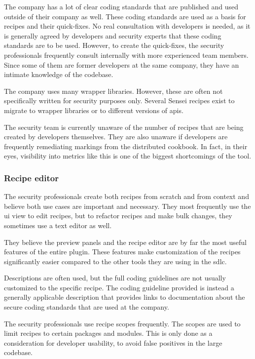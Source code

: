 The company has a lot of clear coding standards that are published and used outside of their company as well.
These coding standards are used as a basis for recipes and their quick-fixes.
No real consultation with developers is needed, as it is generally agreed by developers and security experts that these coding standards are to be used.
However, to create the quick-fixes, the security professionals frequently consult internally with more experienced team members.
Since some of them are former developers at the same company, they have an intimate knowledge of the codebase.

The company uses many wrapper libraries.
However, these are often not specifically written for security purposes only.
Several Sensei recipes exist to migrate to wrapper libraries or to different versions of \glspl{api}.

The security team is currently unaware of the number of recipes that are being created by developers themselves.
They are also unaware if developers are frequently remediating markings from the distributed cookbook.
In fact, in their eyes, visibility into metrics like this is one of the biggest shortcomings of the tool.

\subsubsection{Recipe editor}
The security professionals create both recipes from scratch and from context and believe both use cases are important and necessary.
They most frequently use the \gls{ui} view to edit recipes, but to refactor recipes and make bulk changes, they sometimes use a text editor as well.

They believe the preview panels and the recipe editor are by far the most useful features of the entire plugin.
These features make customization of the recipes significantly easier compared to the other tools they are using in the \gls{sdlc}.

Descriptions are often used, but the full coding guidelines are not usually customized to the specific recipe.
The coding guideline provided is instead a generally applicable description that provides links to documentation about the secure coding standards that are used at the company.

The security professionals use recipe scopes frequently.
The scopes are used to limit recipes to certain packages and modules.
This is only done as a consideration for developer usability, to avoid false positives in the large codebase.

